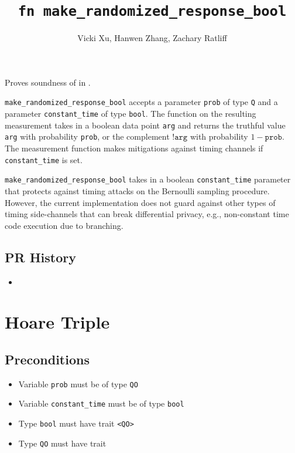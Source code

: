 \documentclass{article}
\title{\texttt{fn make\_randomized\_response\_bool}}
\author{Vicki Xu, Hanwen Zhang, Zachary Ratliff}
\begin{document}
\maketitle

\contrib

Proves soundness of  in .

\texttt{make\_randomized\_response\_bool} accepts a parameter \texttt{prob} of type \texttt{Q} and a parameter \texttt{constant\_time} of type \texttt{bool}.
The function on the resulting measurement takes in a boolean data point \texttt{arg} and returns the truthful value \texttt{arg} with probability \texttt{prob},
or the complement $\texttt{!arg}$ with probability $1 - \texttt{prob}$.
The measurement function makes mitigations against timing channels if \texttt{constant\_time} is set.

\begin{tcolorbox}
    \begin{warning}
        \texttt{make\_randomized\_response\_bool} takes in a boolean \texttt{constant\_time} parameter that protects against timing attacks on the Bernoulli sampling procedure.
        However, the current implementation does not guard against other types of timing side-channels that can break differential privacy, e.g., non-constant time code execution due to branching.
    \end{warning}
\end{tcolorbox}

\subsection*{PR History}
\begin{itemize}
    \item {}
\end{itemize}

\section{Hoare Triple}

\subsection*{Preconditions}
\begin{itemize}
    \item Variable \texttt{prob} must be of type \texttt{QO}
    \item Variable \texttt{constant\_time} must be of type \texttt{bool}
    \item Type \texttt{bool} must have trait \texttt{<QO>}
    \item Type \texttt{QO} must have trait 
\end{itemize}
\end{document}
